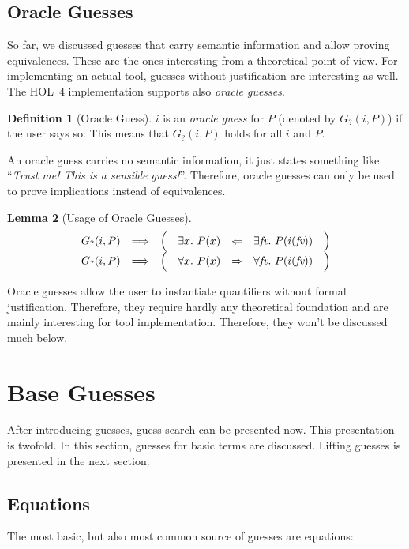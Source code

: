 \documentclass[a4paper,12pt,DIV=12,oneside]{scrbook}
\newcommand{\fv}{\textit{fv}}
\newtheorem{lemma}{Lemma}[section]
\theoremstyle{definition}
\newtheorem{definition}[lemma]{Definition}
\theoremstyle{remark}
\newcommand{\GO}{\ensuremath{G_{?}}}
\begin{document}
\subsection{Oracle Guesses}

So far, we discussed guesses that carry semantic information and allow
proving equivalences. These are the ones interesting from a theoretical point of view.
For implementing an actual tool, guesses without justification are interesting as well.
The HOL~4 implementation supports also \emph{oracle guesses}.
\begin{definition}[Oracle Guess]
  $i$ is an \emph{oracle guess} for $P$ (denoted by $\GO(i,
  P)$) if the user says so. This means that $\GO(i, P)$ holds for all $i$ and $P$.
\end{definition}
%
An oracle guess carries no semantic information, it just states something
like ``\textit{Trust me! This is a sensible guess!}''. Therefore, oracle
guesses can only be used to prove implications instead of
equivalences. 
%
\begin{lemma}[Usage of Oracle Guesses]
\[
\begin{array}[t]{cccrclc}
  \GO(i, P) & \Longrightarrow & \Big( & \exists x.\ P(x) & \Leftarrow & \exists \fv.\ P(i(\fv)) & \Big) \\ 
  \GO(i, P) & \Longrightarrow & \Big( & \forall x.\ P(x) & \Rightarrow & \forall \fv.\ P(i(\fv)) & \Big) 
\end{array}
\]
\end{lemma}
%
Oracle guesses allow the user to instantiate quantifiers without formal justification. 
Therefore, they require hardly any theoretical foundation and 
are mainly interesting for tool implementation. Therefore, they won't be discussed much below.

\section{Base Guesses}
\label{sec_base_guesses}
After introducing guesses, guess-search can be presented now.
This presentation is twofold. In this section, guesses for basic terms are discussed. Lifting guesses 
is presented in the next section.

\subsection{Equations}
The most basic, but also most common source of guesses are equations:
\end{document}
